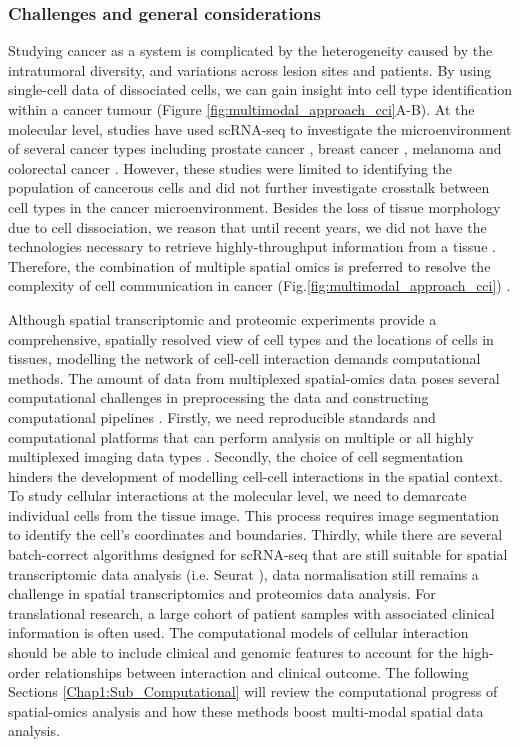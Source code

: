 \subsubsection{Challenges and general considerations}
Studying cancer as a system is complicated by the heterogeneity caused by the intratumoral diversity, and variations across lesion sites and patients. By using single-cell data of dissociated cells, we can gain insight into cell type identification within a cancer tumour (Figure \ref{fig:multimodal_approach_cci}A-B). At the molecular level, studies have used scRNA-seq to investigate the microenvironment of several cancer types including prostate cancer \cite{miyamoto2015rna}, breast cancer \cite{brady2017combating}, melanoma \cite{tirosh2016dissecting} and colorectal cancer \cite{li2017reference}. However, these studies were limited to identifying the population of cancerous cells and did not further investigate crosstalk between cell types in the cancer microenvironment. Besides the loss of tissue morphology due to cell dissociation, we reason that until recent years, we did not have the technologies necessary to retrieve highly-throughput information from a tissue \cite{bodenmiller2016multiplexed}. Therefore, the combination of multiple spatial omics is preferred to resolve the complexity of cell communication in cancer (Fig.\ref{fig:multimodal_approach_cci}) \cite{de2020unraveling}.   

Although spatial transcriptomic and proteomic experiments provide a comprehensive, spatially resolved view of cell types and the locations of cells in tissues, modelling the network of cell-cell interaction demands computational methods. The amount of data from multiplexed spatial-omics data poses several computational challenges in preprocessing the data and constructing computational pipelines \cite{wu2022spatial}. Firstly, we need reproducible standards and computational platforms that can perform analysis on multiple or all highly multiplexed imaging data types \cite{bodenmiller2016multiplexed, schuffler2015automatic}. Secondly, the choice of cell segmentation hinders the development of modelling cell-cell interactions in the spatial context. To study cellular interactions at the molecular level, we need to demarcate individual cells from the tissue image. This process requires image segmentation to identify the cell's coordinates and boundaries. Thirdly, while there are several batch-correct algorithms designed for scRNA-seq that are still suitable for spatial transcriptomic data analysis (i.e. Seurat \cite{butler2018integrating}), data normalisation still remains a challenge in spatial transcriptomics and proteomics data analysis. For translational research, a large cohort of patient samples with associated clinical information is often used. The computational models of cellular interaction should be able to include clinical and genomic features to account for the high-order relationships between interaction and clinical outcome. The following Sections \ref{Chap1:Sub_Computational} will review the computational progress of spatial-omics analysis and how these methods boost multi-modal spatial data analysis.  

